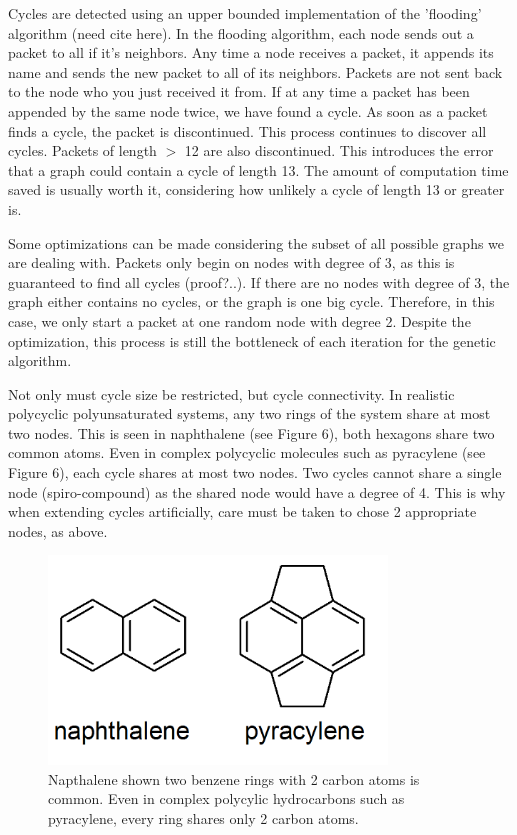 \documentclass[12pt]{article}
\begin{document}
Cycles are detected using an upper bounded implementation of the 'flooding' algorithm (need cite here). In the flooding algorithm, each node sends out a packet to all if it's neighbors. Any time a node receives a packet, it appends its name and sends the new packet to all of its neighbors. Packets are not sent back to the node who you just received it from. If at any time a packet has been appended by the same node twice, we have found a cycle. As soon as a packet finds a cycle, the packet is discontinued. This process continues to discover all cycles. Packets of length $>$ 12 are also discontinued. This introduces the error that a graph could contain a cycle of length 13. The amount of computation time saved is usually worth it, considering how unlikely a cycle of length 13 or greater is. 

Some optimizations can be made considering the subset of all possible graphs we are dealing with. Packets only begin on nodes with degree of 3, as this is guaranteed to find all cycles (proof?..). If there are no nodes with degree of 3, the graph either contains no cycles, or the graph is one big cycle. Therefore, in this case, we only start a packet at one random node with degree 2. Despite the optimization, this process is still the bottleneck of each iteration for the genetic algorithm.

Not only must cycle size be restricted, but cycle connectivity. In realistic polycyclic polyunsaturated systems, any two rings of the system share at most two nodes. This is seen in naphthalene (see Figure 6), both hexagons share two common atoms. Even in complex polycyclic molecules such as pyracylene (see Figure 6), each cycle shares at most two nodes. Two cycles cannot share a single node (spiro-compound) as the shared node would have a degree of 4. This is why when extending cycles artificially, care must be taken to chose 2 appropriate nodes, as above.

\begin{figure}[ht!]
\centering
\includegraphics[width=90mm]{polycyclic.png}
\caption{Napthalene shown two benzene rings with 2 carbon atoms is common. Even in complex polycylic hydrocarbons such as pyracylene, every ring shares only 2 carbon atoms.}
\end{figure}
\end{document}
